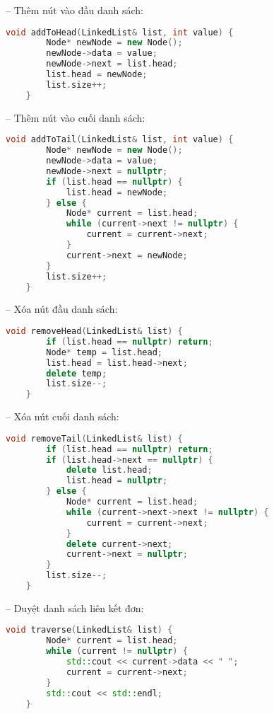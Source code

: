 \begin{enumerate}[label=\alph*.]
  -- Thêm nút vào đầu danh sách:
  \begin{lstlisting}[language=C++]
    void addToHead(LinkedList& list, int value) {
        Node* newNode = new Node();
        newNode->data = value;
        newNode->next = list.head;
        list.head = newNode;
        list.size++;
    }
  \end{lstlisting}
  \vspace{-4.em}
  -- Thêm nút vào cuối danh sách:
  \begin{lstlisting}[language=C++]
    void addToTail(LinkedList& list, int value) {
        Node* newNode = new Node();
        newNode->data = value;
        newNode->next = nullptr;
        if (list.head == nullptr) {
            list.head = newNode; 
        } else {
            Node* current = list.head;
            while (current->next != nullptr) {
                current = current->next; 
            }
            current->next = newNode;
        }
        list.size++;
    }
  \end{lstlisting}
  \vspace{-4.em}
  -- Xóa nút đầu danh sách:
  \begin{lstlisting}[language=C++]
    void removeHead(LinkedList& list) {
        if (list.head == nullptr) return; 
        Node* temp = list.head;
        list.head = list.head->next;
        delete temp;
        list.size--;
    }
  \end{lstlisting}
  \vspace{-4.em}
  -- Xóa nút cuối danh sách:
  \begin{lstlisting}[language=C++]
    void removeTail(LinkedList& list) {
        if (list.head == nullptr) return; 
        if (list.head->next == nullptr) { 
            delete list.head;
            list.head = nullptr;
        } else {
            Node* current = list.head;
            while (current->next->next != nullptr) {
                current = current->next; 
            }
            delete current->next; 
            current->next = nullptr; 
        }
        list.size--;
    }
  \end{lstlisting}
  \vspace{-4.em}
  -- Duyệt danh sách liên kết đơn:
  \begin{lstlisting}[language=C++]
    void traverse(LinkedList& list) {
        Node* current = list.head;
        while (current != nullptr) {
            std::cout << current->data << " ";
            current = current->next;
        }
        std::cout << std::endl;
    }
  \end{lstlisting}
\end{enumerate}
\vspace{-7.em}
